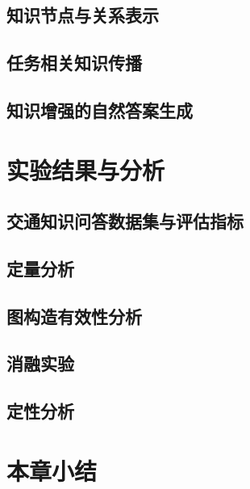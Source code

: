 \subsection{知识节点与关系表示}

\subsection{任务相关知识传播}

\subsection{知识增强的自然答案生成}

\section{实验结果与分析}

\subsection{交通知识问答数据集与评估指标}

\subsection{定量分析}

\subsection{图构造有效性分析}

\subsection{消融实验}

\subsection{定性分析}

\section{本章小结}
